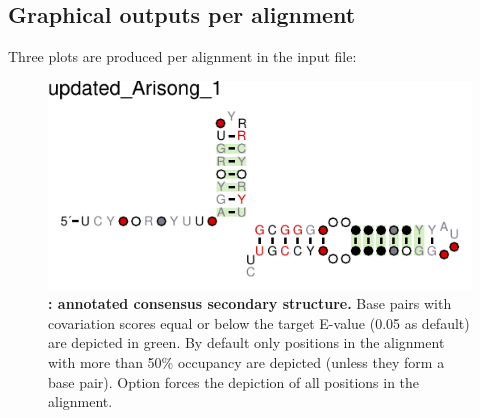 \clearpage
\subsection{Graphical outputs per alignment}
 Three plots are produced per alignment in the input file: 

 \begin{figure}[h]
   \includegraphics[scale=1.5]{Arisong_R2R.pdf} 
 \caption{\small\textbf{:
     annotated consensus secondary structure.} Base pairs with
   covariation scores equal or below the target E-value (0.05 as
   default) are depicted in green. By default only positions in the
   alignment with more than 50\% occupancy are depicted (unless they form
   a base pair). Option  forces the depiction of all
   positions in the alignment.  }
 \label{fig:r2r}
 \end{figure}

